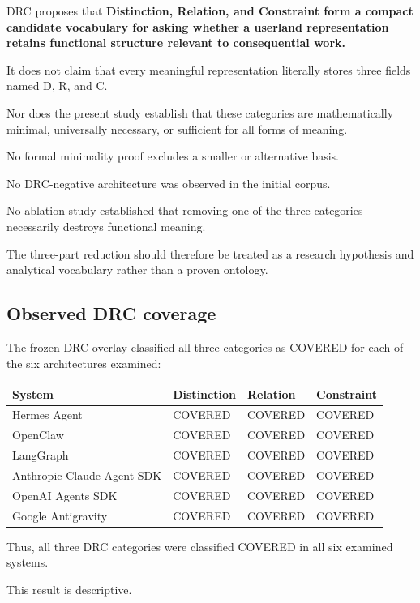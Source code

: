 \documentclass[11pt]{article}
\begin{document}
DRC proposes that \textbf{Distinction, Relation, and Constraint form a compact candidate vocabulary for asking whether a userland representation retains functional structure relevant to consequential work.}

It does not claim that every meaningful representation literally stores three fields named D, R, and C.

Nor does the present study establish that these categories are mathematically minimal, universally necessary, or sufficient for all forms of meaning.

No formal minimality proof excludes a smaller or alternative basis.

No DRC-negative architecture was observed in the initial corpus.

No ablation study established that removing one of the three categories necessarily destroys functional meaning.

The three-part reduction should therefore be treated as a research hypothesis and analytical vocabulary rather than a proven ontology.

\subsection{Observed DRC coverage}

The frozen DRC overlay classified all three categories as COVERED for each of the six architectures examined:

\begin{table}[htbp]
\centering
\small
\begin{tabular}{llll}
\toprule
System & Distinction & Relation & Constraint \\
\midrule
Hermes Agent & COVERED & COVERED & COVERED \\
OpenClaw & COVERED & COVERED & COVERED \\
LangGraph & COVERED & COVERED & COVERED \\
Anthropic Claude Agent SDK & COVERED & COVERED & COVERED \\
OpenAI Agents SDK & COVERED & COVERED & COVERED \\
Google Antigravity & COVERED & COVERED & COVERED \\
\bottomrule
\end{tabular}
\end{table}


Thus, all three DRC categories were classified COVERED in all six examined systems.

This result is descriptive.
\end{document}
